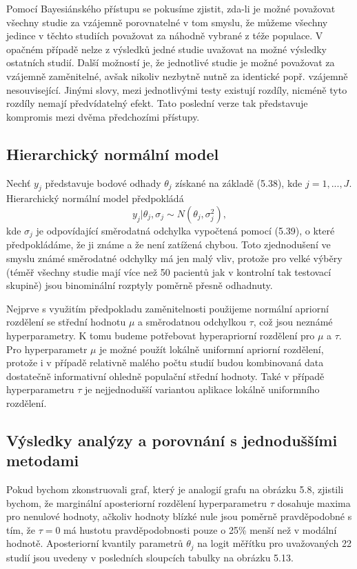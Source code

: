 Pomocí Bayesiánského přístupu se pokusíme zjistit, zda-li je možné považovat všechny studie za vzájemně porovnatelné v tom smyslu, že můžeme všechny jedince v těchto studiích považovat za náhodně vybrané z téže populace. V opačném případě nelze z výsledků jedné studie uvažovat na možné výsledky ostatních studií. Další možností je, že jednotlivé studie je možné považovat za vzájemně zaměnitelné, avšak nikoliv nezbytně nutně za identické popř. vzájemně nesouvisející. Jinými slovy, mezi jednotlivými testy existují rozdíly, nicméně tyto rozdíly nemají předvídatelný efekt. Tato poslední verze tak představuje kompromis mezi dvěma předchozími přístupy.

\subsection{Hierarchický normální model}

Nechť $y_j$ představuje bodové odhady $\theta_j$ získané na základě (5.38), kde $j = 1, ..., J$. Hierarchický normální model předpokládá
\begin{equation}
y_j | \theta_j, \sigma_j \sim N(\theta_j, \sigma_j^2),
\end{equation}
kde $\sigma_j$ je odpovídající směrodatná odchylka vypočtená pomocí (5.39), o které předpokládáme, že ji známe a že není zatížená chybou. Toto zjednodušení ve smyslu známé směrodatné odchylky má jen malý vliv, protože pro velké výběry (téměř všechny studie mají více než 50 pacientů jak v kontrolní tak testovací skupině) jsou binominální rozptyly poměrně přesně odhadnuty.

Nejprve s využitím předpokladu zaměnitelnosti použijeme normální apriorní rozdělení se střední hodnotu $\mu$ a směrodatnou odchylkou $\tau$, což jsou neznámé hyperparametry. K tomu budeme potřebovat hyperapriorní rozdělení pro $\mu$ a $\tau$. Pro hyperparametr $\mu$ je možné použít lokálně uniformní apriorní rozdělení, protože i v případě relativně malého počtu studií budou kombinovaná data dostatečně informativní ohledně populační střední hodnoty. Také v případě hyperparametru $\tau$ je nejjednodušší variantou aplikace lokálně uniformního rozdělení.

\subsection{Výsledky analýzy a porovnání s jednoduššími metodami}

Pokud bychom zkonstruovali graf, který je analogií grafu na obrázku 5.8, zjistili bychom, že marginální aposteriorní rozdělení hyperparametru $\tau$ dosahuje maxima pro nenulové hodnoty, ačkoliv hodnoty blízké nule jsou poměrně pravděpodobné s tím, že $\tau = 0$ má hustotu pravděpodobnosti pouze o 25\% menší než v modální hodnotě. Aposteriorní kvantily parametrů $\theta_j$ na logit měřítku pro uvažovaných 22 studií jsou uvedeny v posledních sloupcích tabulky na obrázku 5.13.


